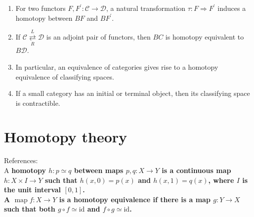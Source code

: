 \begin{theo}
    \begin{enumerate}
        \item For two functors $F, F^{\prime}: \mathcal{C} \rightarrow \mathcal{D}$, a natural transformation $\tau: F \Rightarrow F^{\prime}$ induces a homotopy between $B F$ and $B F^{\prime}$.
        \item If $\mathcal{C} \underset{R}{\stackrel{L}{\rightleftarrows}} \mathcal{D}$ is an adjoint pair of functors, then $B C$ is homotopy equivalent to $B \mathcal{D}$. 
        \item In particular, an equivalence of categories gives rise to a homotopy equivalence of classifying spaces.
        \item If a small category \cc has an initial or terminal object, then its classifying space is contractible.
    \end{enumerate}
\end{theo}










\chapter{Homotopy theory}

References: \cite{mayConciseCourseAlgebraic1999,cohen}\\

 
A \bf{homotopy} $h: p \simeq q$ between maps $p, q: X \longrightarrow Y$ is a continuous map $h: X \times I \longrightarrow Y$ such that $h(x, 0)=p(x)$ and $h(x, 1)=q(x)$, where $I$ is the unit interval $[0,1]$.\\
A $\operatorname{map} f: X \longrightarrow Y$ is a \textbf{homotopy equivalence} if there is a map $g: Y \longrightarrow X$ such that both $g \circ f \simeq \mathrm{id}$ and $f \circ g \simeq \mathrm{id}$.\\

